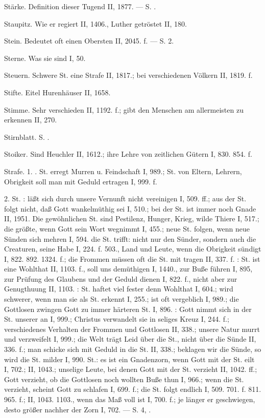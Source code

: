 Stärke. Definition dieser Tugend II, 1877. — S. .

Staupitz. Wie er regiert II, 1406., Luther getröstet II, 180.

Stein. Bedeutet oft einen Obersten II, 2045. f. — S.  2.

Sterne. Was sie sind I, 50.

Steuern. Schwere St. eine Strafe II, 1817.; bei verschiedenen Völkern II, 1819. f.

Stifte. Eitel Hurenhäuser II, 1658.

Stimme. Sehr verschieden II, 1192. f.; gibt den Menschen am allermeisten zu erkennen II, 270.

Stirnblatt. S. .

Stoiker. Sind Heuchler II, 1612.; ihre Lehre von zeitlichen Gütern I, 830. 854. f.

Strafe. 1. . St. erregt Murren u. Feindschaft I, 989.; St. von Eltern, Lehrern, Obrigkeit soll man mit Geduld ertragen I, 999. f.

2.  St. :  läßt sich durch unsere Vernunft nicht vereinigen I, 509. ff.; aus der St. folgt nicht, daß Gott wankelmüthig sei I, 510.; bei der St. ist immer noch Gnade II, 1951. Die gewöhnlichen St. sind Pestilenz, Hunger, Krieg, wilde Thiere I, 517.; die größte, wenn Gott sein Wort wegnimmt I, 455.; neue St. folgen, wenn neue Sünden sich mehren I, 594.  die St. trifft: nicht nur den Sünder, sondern auch die Creaturen, seine Habe I, 224. f. 503., Land und Leute, wenn die Obrigkeit sündigt I, 822. 892. 1324. f.; die Frommen müssen oft die St. mit tragen II, 337. f. : St. ist eine Wohlthat II, 1103. f., soll uns demüthigen I, 1440., zur Buße führen I, 895, zur Prüfung des Glaubens und der Geduld dienen I, 822. f., nicht aber zur Genugthuung II, 1103. : St. haftet viel fester denn Wohlthat I, 604.; wird schwerer, wenn man sie als St. erkennt I, 255.; ist oft vergeblich I, 989.; die Gottlosen zwingen Gott zu immer härteren St. I, 896. : Gott nimmt sich in der St. unserer an I, 999.; Christus verwandelt sie in seliges Kreuz I, 244. f.; verschiedenes Verhalten der Frommen und Gottlosen II, 338.; unsere Natur murrt und verzweifelt I, 999.; die Welt trägt Leid über die St., nicht über die Sünde II, 336. f.; man schicke sich mit Geduld in die St. II, 338.; beklagen wir die Sünde, so wird die St. milder I, 990.  St.: es ist ein Gnadenzorn, wenn Gott mit der St. eilt I, 702.; II, 1043.; unselige Leute, bei denen Gott mit der St. verzieht II, 1042. ff.; Gott verzieht, ob die Gottlosen noch wollten Buße thun I, 966.; wenn die St. verzieht, scheint Gott zu schlafen I, 699. f.; die St. folgt endlich I, 509. 701. f. 811. 965. f.; II, 1043. 1103., wenn das Maß voll ist I, 700. f.; je länger er geschwiegen, desto größer nachher der Zorn I, 702. — S.  4, .

